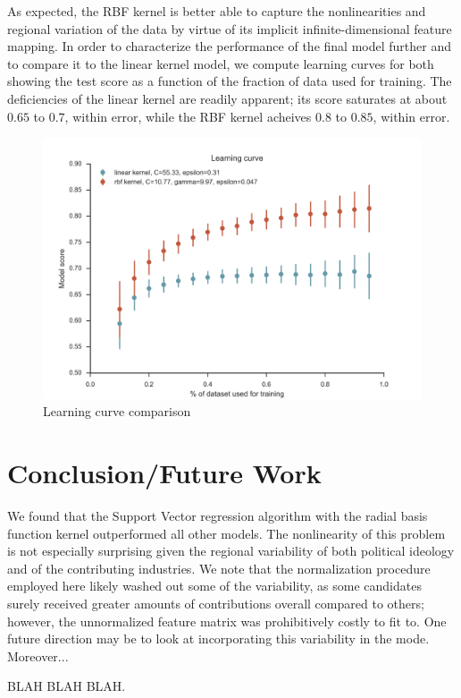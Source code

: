 \documentclass[10]{article}
\begin{document}
\noindent As expected, the RBF kernel is better able to capture the nonlinearities and regional variation of the data by virtue of its implicit infinite-dimensional feature mapping. In order to characterize the performance of the final model further and to compare it to the linear kernel model, we compute learning curves for both showing the test score as a function of the fraction of data used for training. The deficiencies of the linear kernel are readily apparent; its score saturates at about $0.65$ to $0.7$, within error, while the RBF kernel acheives $0.8$ to $0.85$, within error. 

\begin{figure}[H]
\begin{center}
\includegraphics[width=0.8\linewidth]{learning_curve.png}
\caption{Learning curve comparison}
\end{center}
\end{figure}


\section*{Conclusion/Future Work}


\noindnet We found that the Support Vector regression algorithm with the radial basis function kernel outperformed all other models. The nonlinearity of this problem is not especially surprising given the regional variability of both political ideology and of the contributing industries. We note that the normalization procedure employed here likely washed out some of the variability, as some candidates surely received greater amounts of contributions overall compared to others; however, the unnormalized feature matrix was prohibitively costly to fit to. One future direction may be to look at incorporating this variability in the mode. Moreover...

BLAH BLAH BLAH. \\

\printbibliography
\end{document}
